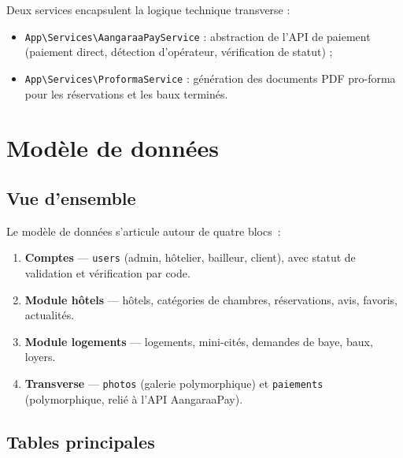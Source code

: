 \documentclass[11pt,a4paper]{report}
\newcommand{\tech}[1]{\texttt{\small #1}}
\begin{document}
Deux services encapsulent la logique technique transverse :

\begin{itemize}[leftmargin=1.2cm]
    \item \tech{App\textbackslash Services\textbackslash AangaraaPayService} : abstraction de l'API de paiement (paiement direct, détection d'opérateur, vérification de statut) ;
    \item \tech{App\textbackslash Services\textbackslash ProformaService} : génération des documents PDF pro-forma pour les réservations et les baux terminés.
\end{itemize}

\chapter{Modèle de données}

\section{Vue d'ensemble}
Le modèle de données s'articule autour de quatre blocs~:

\begin{enumerate}[leftmargin=1.2cm]
    \item \textbf{Comptes} --- \tech{users} (admin, hôtelier, bailleur, client), avec statut de validation et vérification par code.
    \item \textbf{Module hôtels} --- hôtels, catégories de chambres, réservations, avis, favoris, actualités.
    \item \textbf{Module logements} --- logements, mini-cités, demandes de baye, baux, loyers.
    \item \textbf{Transverse} --- \tech{photos} (galerie polymorphique) et \tech{paiements} (polymorphique, relié à l'API AangaraaPay).
\end{enumerate}

\section{Tables principales}
\end{document}
